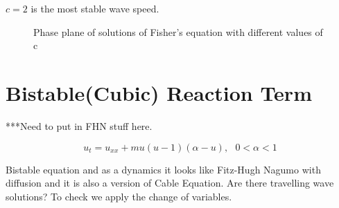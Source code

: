 \documentclass[]{article}
\numberwithin{equation}{section}		%
\begin{document}
$c=2$ is the most stable wave speed.

\begin{figure}[tbh]
\begin{centering}
\par\end{centering}
\caption{\label{figure:PF}Phase plane of solutions of Fisher's equation with different values of c}
\end{figure}


\section{Bistable(Cubic) Reaction Term}
***Need to put in FHN stuff here.

\begin{equation}
u_t=u_{xx}+mu(u - 1)(\alpha - u), \ \ \ 0<\alpha<1
\end{equation}

Bistable equation and as a dynamics it looks like Fitz-Hugh Nagumo with diffusion and it is also a version of Cable Equation.
\newline
\noindent Are there travelling wave solutions? To check we apply the
change of variables.
\end{document}
